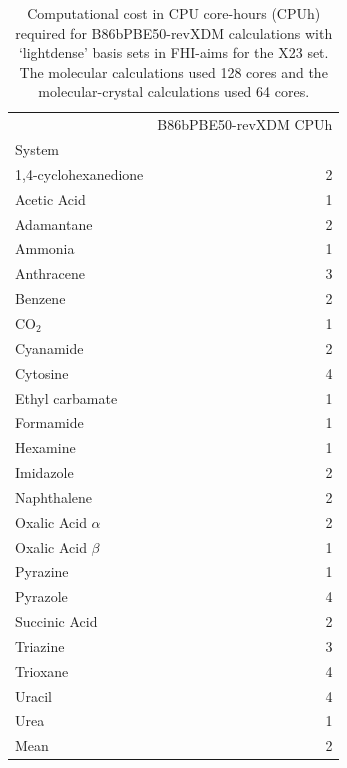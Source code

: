 \begin{table}[h]

\caption{\label{tab:x23_xdm_cpuh}Computational cost in CPU core-hours (CPUh) required for B86bPBE50-revXDM calculations with `lightdense' basis sets in FHI-aims for the X23 set. The molecular calculations used 128 cores and the molecular-crystal calculations used 64 cores.}
\begin{tabular}{lr}
\toprule
 & B86bPBE50-revXDM CPUh \\ 
System &  \\
\midrule
1,4-cyclohexanedione & 2 \\
Acetic Acid & 1 \\
Adamantane & 2 \\
Ammonia & 1 \\
Anthracene & 3 \\
Benzene & 2 \\
CO$_2$ & 1 \\
Cyanamide & 2 \\
Cytosine & 4 \\
Ethyl carbamate & 1 \\
Formamide & 1 \\
Hexamine & 1 \\
Imidazole & 2 \\
Naphthalene & 2 \\
Oxalic Acid $\alpha$ & 2 \\
Oxalic Acid $\beta$ & 1 \\
Pyrazine & 1 \\
Pyrazole & 4 \\
Succinic Acid & 2 \\
Triazine & 3 \\
Trioxane & 4 \\
Uracil & 4 \\
Urea & 1 \\
Mean & 2 \\
\bottomrule
\end{tabular}

\end{table}
